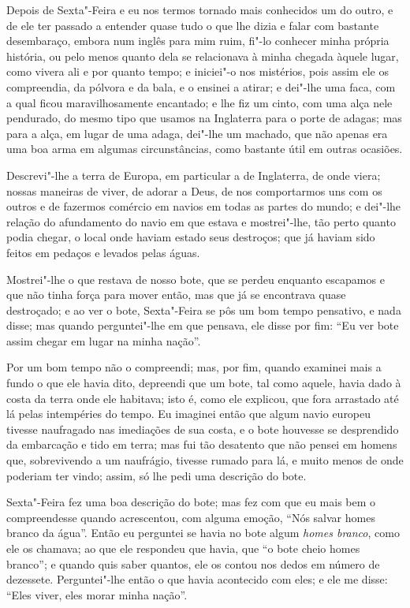 Depois de Sexta"-Feira e eu nos termos tornado mais conhecidos um do
outro, e de ele ter passado a entender quase tudo o que lhe dizia e
falar com bastante desembaraço, embora num inglês para mim ruim, fi"-lo
conhecer minha própria história, ou pelo menos quanto dela se
relacionava à minha chegada àquele lugar, como vivera ali e por quanto
tempo; e iniciei"-o nos mistérios, pois assim ele os compreendia, da
pólvora e da bala, e o ensinei a atirar; e dei"-lhe uma faca, com a qual
ficou maravilhosamente encantado; e lhe fiz um cinto, com uma alça nele
pendurado, do mesmo tipo que usamos na Inglaterra para o porte de
adagas; mas para a alça, em lugar de uma adaga, dei"-lhe um machado, que
não apenas era uma boa arma em algumas circunstâncias, como bastante
útil em outras ocasiões.

Descrevi"-lhe a terra de Europa, em particular a de Inglaterra, de onde
viera; nossas maneiras de viver, de adorar a Deus, de nos comportarmos
uns com os outros e de fazermos comércio em navios em todas as partes do
mundo; e dei"-lhe relação do afundamento do navio em que estava e
mostrei"-lhe, tão perto quanto podia chegar, o local onde haviam estado
seus destroços; que já haviam sido feitos em pedaços e levados pelas
águas.

Mostrei"-lhe o que restava de nosso bote, que se perdeu enquanto
escapamos e que não tinha força para mover então, mas que já se
encontrava quase destroçado; e ao ver o bote, Sexta"-Feira se pôs um bom
tempo pensativo, e nada disse; mas quando perguntei"-lhe em que pensava,
ele disse por fim: ``Eu ver bote assim chegar em lugar na minha nação''.

Por um bom tempo não o compreendi; mas, por fim, quando examinei mais a
fundo o que ele havia dito, depreendi que um bote, tal como aquele,
havia dado à costa da terra onde ele habitava; isto é, como ele
explicou, que fora arrastado até lá pelas intempéries do tempo. Eu
imaginei então que algum navio europeu tivesse naufragado nas imediações
de sua costa, e o bote houvesse se desprendido da embarcação e tido em
terra; mas fui tão desatento que não pensei em homens que, sobrevivendo
a um naufrágio, tivesse rumado para lá, e muito menos de onde poderiam
ter vindo; assim, só lhe pedi uma descrição do bote.

Sexta"-Feira fez uma boa descrição do bote; mas fez com que eu mais bem o
compreendesse quando acrescentou, com alguma emoção, ``Nós salvar homes
branco da água''. Então eu perguntei se havia no bote algum \emph{homes
branco}, como ele os chamava; ao que ele respondeu que havia, que ``o
bote cheio homes branco''; e quando quis saber quantos, ele os contou
nos dedos em número de dezessete. Perguntei"-lhe então o que havia
acontecido com eles; e ele me disse: ``Eles viver, eles morar minha
nação''.

